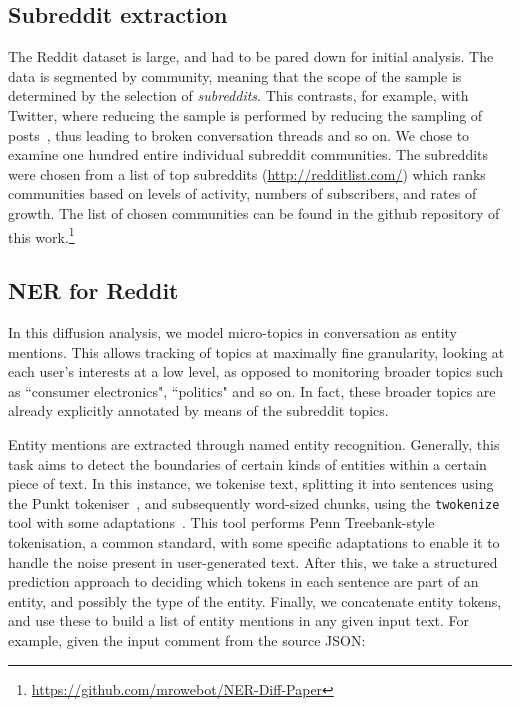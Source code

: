 \documentclass[acmsmall]{acmart}
\begin{document}
\subsection{Subreddit extraction}

The Reddit dataset is large, and had to be pared down for initial analysis.
The data is segmented by community, meaning that the scope of the sample is determined by the selection of {\em subreddits}.
This contrasts, for example, with Twitter, where reducing the sample is performed by reducing the sampling of posts~\cite{kergl2014endogenesis}, thus leading to broken conversation threads and so on.
We chose to examine one hundred entire individual subreddit communities.
The subreddits were chosen from a list of top subreddits (\url{http://redditlist.com/}) which ranks communities based on levels of activity, numbers of subscribers, and rates of growth.
The list of chosen communities can be found in the github repository of this work.\footnote{\url{https://github.com/mrowebot/NER-Diff-Paper}}


\subsection{NER for Reddit}

In this diffusion analysis, we model micro-topics in conversation as entity mentions.
This allows tracking of topics at maximally fine granularity, looking at each user's interests at a low level, as opposed to monitoring broader topics such as ``consumer electronics", ``politics" and so on.
In fact, these broader topics are already explicitly annotated by means of the subreddit topics.

Entity mentions are extracted through named entity recognition.
Generally, this task aims to detect the boundaries of certain kinds of entities within a certain piece of text.
In this instance, we tokenise text, splitting it into sentences using the Punkt tokeniser~\cite{kiss2006unsupervised}, and subsequently word-sized chunks, using the {\tt twokenize} tool with some adaptations~\cite{o2010tweetmotif}.
This tool performs Penn Treebank-style tokenisation, a common standard, with some specific adaptations to enable it to handle the noise present in user-generated text.
After this, we take a structured prediction approach to deciding which tokens in each sentence are part of an entity, and possibly the type of the entity.
Finally, we concatenate entity tokens, and use these to build a list of entity mentions in any given input text.
For example, given the input comment from the source JSON:
\end{document}

